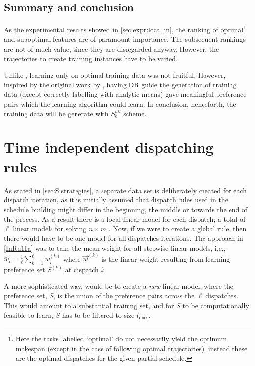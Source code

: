 \subsection{Summary and conclusion }
As the experimental results showed in \cref{sec:expr:locallin}, the ranking of optimal\footnote{Here the tasks labelled `optimal' do not necessarily yield the optimum makespan (except in the case of following optimal trajectories), instead these are the optimal dispatches for the given partial schedule.} and suboptimal features are of paramount importance. The subsequent rankings are not of much value, since they are disregarded anyway. However, the trajectories to create training instances have to be varied.

Unlike \citep{Siggi10,Malik08,Russell09}, learning only on optimal training data was not fruitful. However, inspired by the original work by \cite{Siggi05}, having DR guide the generation of training data (except correctly labelling with analytic means) gave meaningful preference pairs which the learning algorithm could learn. In conclusion, henceforth, the training data will be generate with $S_{b}^{all}$ scheme.


\section{Time independent dispatching rules}\label{sec:pref:scalability}
As stated in \cref{sec:S:strategies}, a separate data set is deliberately 
created for each dispatch iteration, as it is initially assumed that dispatch 
rules used in the schedule building might differ in the beginning, the middle 
or towards the end of the process. As a result there is a local linear model 
for each dispatch; a total of $\ell$ linear models for solving $n\times m$ 
\jsp. Now, if we were to create a global rule, then there would have to be one 
model for all dispatches iterations. The approach in \cref{InRu11a} was to take 
the mean weight for all stepwise linear models, i.e., 
$\bar{w}_i=\frac{1}{\ell}\sum_{k=1}^{\ell}w_i^{(k)}$ where $\vec{w}^{(k)}$ is 
the linear weight resulting from learning preference set $S^{(k)}$ at dispatch 
$k$. 

A more sophisticated way, would be to create a \emph{new} linear model, where the preference set, $S$, is the union of the preference pairs across the $\ell$ dispatches. This would amount to a substantial training set, and for $S$ to be computationally feasible to learn, $S$ has to be filtered to size $l_{\max}$.

